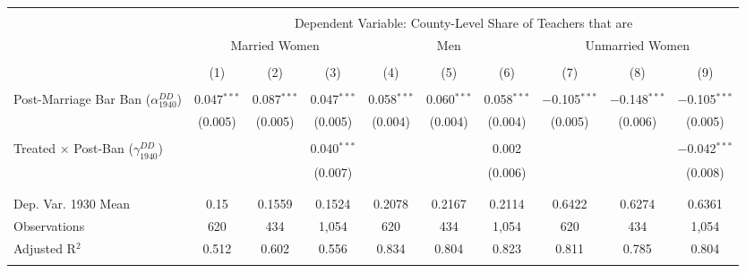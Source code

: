 
\begin{tabular}{@{\extracolsep{5pt}}lccccccccc} 
\\[-1.8ex]\hline 
\hline \\[-1.8ex] 
 & \multicolumn{9}{c}{Dependent Variable: County-Level Share of Teachers that are} \\ 
\cline{2-10} 
 & \multicolumn{3}{c}{Married Women} & \multicolumn{3}{c}{Men} & \multicolumn{3}{c}{Unmarried Women} \\ 
\\[-1.8ex] & (1) & (2) & (3) & (4) & (5) & (6) & (7) & (8) & (9)\\ 
\hline \\[-1.8ex] 
 Post-Marriage Bar Ban ($\alpha_{1940}^{DD}$) & 0.047$^{***}$ & 0.087$^{***}$ & 0.047$^{***}$ & 0.058$^{***}$ & 0.060$^{***}$ & 0.058$^{***}$ & $-$0.105$^{***}$ & $-$0.148$^{***}$ & $-$0.105$^{***}$ \\ 
  & (0.005) & (0.005) & (0.005) & (0.004) & (0.004) & (0.004) & (0.005) & (0.006) & (0.005) \\ 
  & & & & & & & & & \\ 
 Treated $\times$ Post-Ban ($\gamma_{1940}^{DD}$) &  &  & 0.040$^{***}$ &  &  & 0.002 &  &  & $-$0.042$^{***}$ \\ 
  &  &  & (0.007) &  &  & (0.006) &  &  & (0.008) \\ 
  & & & & & & & & & \\ 
\hline \\[-1.8ex] 
Dep. Var. 1930 Mean & 0.15 & 0.1559 & 0.1524 & 0.2078 & 0.2167 & 0.2114 & 0.6422 & 0.6274 & 0.6361 \\ 
Observations & 620 & 434 & 1,054 & 620 & 434 & 1,054 & 620 & 434 & 1,054 \\ 
Adjusted R$^{2}$ & 0.512 & 0.602 & 0.556 & 0.834 & 0.804 & 0.823 & 0.811 & 0.785 & 0.804 \\ 
\hline 
\hline \\[-1.8ex] 
\end{tabular} 

